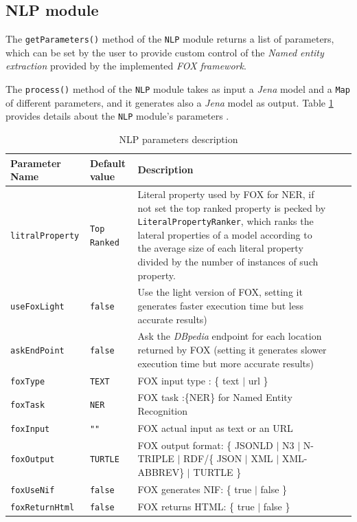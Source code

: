 \documentclass[a4paper,twoside,bibtotoc,abstracton,12pt,BCOR=15mm]{article}
\begin{document}
\endgroup


\subsection{NLP module}
The \texttt{getParameters()} method of the \texttt{NLP} module returns a list of parameters,
which can be set by the user to provide custom control of the \emph{Named entity extraction} provided by the implemented \emph{FOX framework}.

The \texttt{process()} method of the \texttt{NLP} module takes as input a \emph{Jena} model and a \texttt{Map} of different parameters, 
and it generates also a \emph{Jena} model as output.
Table \ref{tbl:nlpPram} provides details about the \texttt{NLP} module's parameters .
\begin{table}[ht]
\caption{NLP parameters description} \label{tbl:nlpPram}
\begin{tabular}{@{}  l  l p{7cm} l p{6cm}@{}}
\toprule
\textbf{Parameter Name} & \textbf{Default value} & \textbf{Description}\\
\midrule
\texttt{litralProperty}	& \texttt{Top Ranked} 	& Literal property used by FOX for NER, if not set the top ranked property is pecked by \texttt{LiteralPropertyRanker}, which ranks the  lateral properties of a model according to the average size of each literal property divided by the number of instances of such property.\\
\texttt{useFoxLight} 	& \texttt{false} 	& Use the light version of FOX, setting it generates faster execution time but less accurate results) \\
\texttt{askEndPoint} 	& \texttt{false} 	& Ask the \emph{DBpedia} endpoint for each location returned by FOX (setting it generates slower execution time but more accurate results)\\
\texttt{foxType} 	& \texttt{TEXT} 	& FOX input type : \{ text $\rvert$ url \}\\
\texttt{foxTask} 	& \texttt{NER} 		& FOX task :\{NER\} for Named Entity Recognition\\
\texttt{foxInput} 	& \texttt{""} 		& FOX actual input as text or an URL\\
\texttt{foxOutput} 	& \texttt{TURTLE} 	& FOX output format: \{ JSONLD $\rvert$ N3 $\rvert$ N-TRIPLE $\rvert$ RDF/\{ JSON $\rvert$ XML $\rvert$ XML-ABBREV\} $\rvert$ TURTLE \}\\
\texttt{foxUseNif} 	& \texttt{false} 	& FOX generates NIF: \{ true $\rvert$ false \}\\
\texttt{foxReturnHtml} & \texttt{false} 	& FOX returns HTML: \{ true $\rvert$ false \}\\ 
\bottomrule
\end{tabular}
\end{table}
\newpage \clearpage
\end{document}

